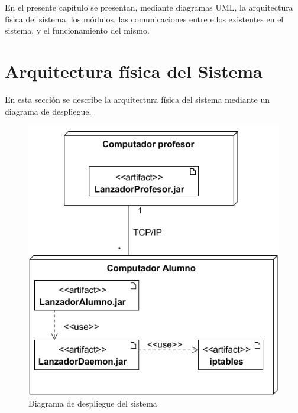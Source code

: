 

\label{chap:arquitectura}

En el presente capítulo se presentan, mediante diagramas UML, la arquitectura física del sistema, los módulos, las comunicaciones entre ellos existentes en el sistema, y el funcionamiento del mismo.


\chaptertoc

\section{Arquitectura física del Sistema}
\label{sec:arquitectura:arqFisica}

En esta sección se describe la arquitectura física del sistema mediante un diagrama de despliegue.
\begin{figure}
    \centering
    \includegraphics[width=\linewidth]{arquitectura/despliegueSistema2}
    \caption{Diagrama de despliegue del sistema}
    \label{fig:arquitectura:despliegueSistema}
\end{figure}
\newline


